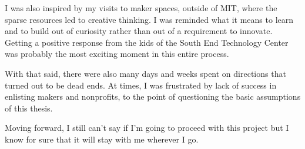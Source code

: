 I was also inspired by my visits to maker spaces, outside of MIT, where the sparse resources led to creative thinking. I was reminded what it means to learn and to build out of curiosity rather than out of a requirement to innovate. Getting a positive response from the kids of the South End Technology Center was probably the most exciting moment in this entire process.

With that said, there were also many days and weeks spent on directions that turned out to be dead ends. At times, I was frustrated by lack of success in enlisting makers and nonprofits, to the point of questioning the basic assumptions of this thesis.

Moving forward, I still can't say if I'm going to proceed with this project but I know for sure that it will stay with me wherever I go.